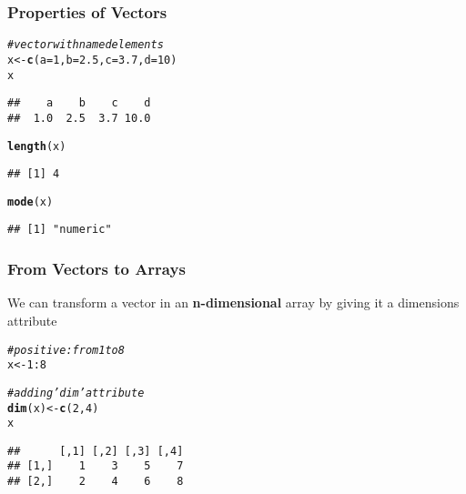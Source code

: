 \documentclass[12pt]{beamer}\usepackage[]{graphicx}\usepackage[]{color}
\makeatletter
\newcommand{\hlnum}[1]{\textcolor[rgb]{0.686,0.059,0.569}{#1}}%
\newcommand{\hlcom}[1]{\textcolor[rgb]{0.678,0.584,0.686}{\textit{#1}}}%
\newcommand{\hlopt}[1]{\textcolor[rgb]{0,0,0}{#1}}%
\newcommand{\hlstd}[1]{\textcolor[rgb]{0.345,0.345,0.345}{#1}}%
\newcommand{\hlkwb}[1]{\textcolor[rgb]{0.69,0.353,0.396}{#1}}%
\newcommand{\hlkwc}[1]{\textcolor[rgb]{0.333,0.667,0.333}{#1}}%
\newcommand{\hlkwd}[1]{\textcolor[rgb]{0.737,0.353,0.396}{\textbf{#1}}}%
\newenvironment{kframe}{%
 \def\at@end@of@kframe{}%
 \ifinner\ifhmode%
  \def\at@end@of@kframe{\end{minipage}}%
  \begin{minipage}{\columnwidth}%
 \fi\fi%
 \def\FrameCommand##1{\hskip\@totalleftmargin \hskip-\fboxsep
 \colorbox{shadecolor}{##1}\hskip-\fboxsep
     \hskip-\linewidth \hskip-\@totalleftmargin \hskip\columnwidth}%
 \MakeFramed {\advance\hsize-\width
   \@totalleftmargin\z@ \linewidth\hsize
   \@setminipage}}%
 {\par\unskip\endMakeFramed%
 \at@end@of@kframe}
\newenvironment{knitrout}{}{} %
\makeatother
\begin{document}

\begin{frame}[fragile]
\frametitle{Properties of Vectors}

\begin{knitrout}\footnotesize
{}\color{fgcolor}\begin{kframe}
\begin{alltt}
\hlcom{# vector with named elements}
\hlstd{x} \hlkwb{<-} \hlkwd{c}\hlstd{(}\hlkwc{a} \hlstd{=} \hlnum{1}\hlstd{,} \hlkwc{b} \hlstd{=} \hlnum{2.5}\hlstd{,} \hlkwc{c} \hlstd{=} \hlnum{3.7}\hlstd{,} \hlkwc{d} \hlstd{=} \hlnum{10}\hlstd{)}
\hlstd{x}
\end{alltt}
\begin{verbatim}
##    a    b    c    d 
##  1.0  2.5  3.7 10.0
\end{verbatim}
\begin{alltt}
\hlkwd{length}\hlstd{(x)}
\end{alltt}
\begin{verbatim}
## [1] 4
\end{verbatim}
\begin{alltt}
\hlkwd{mode}\hlstd{(x)}
\end{alltt}
\begin{verbatim}
## [1] "numeric"
\end{verbatim}
\end{kframe}
\end{knitrout}

\end{frame}


\begin{frame}
\begin{center}
\Huge{}
\end{center}
\end{frame}


\begin{frame}[fragile]
\frametitle{From Vectors to Arrays}

We can transform a vector in an \textbf{n-dimensional} array by giving it a dimensions attribute 
\begin{knitrout}\footnotesize
{}\color{fgcolor}\begin{kframe}
\begin{alltt}
\hlcom{# positive: from 1 to 8}
\hlstd{x} \hlkwb{<-} \hlnum{1}\hlopt{:}\hlnum{8}

\hlcom{# adding 'dim' attribute}
\hlkwd{dim}\hlstd{(x)} \hlkwb{<-} \hlkwd{c}\hlstd{(}\hlnum{2}\hlstd{,} \hlnum{4}\hlstd{)}
\hlstd{x}
\end{alltt}
\begin{verbatim}
##      [,1] [,2] [,3] [,4]
## [1,]    1    3    5    7
## [2,]    2    4    6    8
\end{verbatim}
\end{kframe}
\end{knitrout}

\end{frame}
\end{document}
